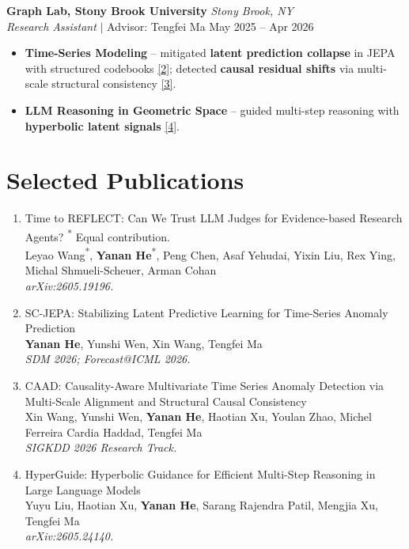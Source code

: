 \documentclass[a4paper,10pt]{article}
\begin{document}
\vspace{4pt}
\textbf{Graph Lab, Stony Brook University} \hfill \textit{Stony Brook, NY} \\
\textit{Research Assistant} $\mid$ Advisor: Tengfei Ma \hfill May 2025 -- Apr 2026
\begin{itemize}
  \item \textbf{Time-Series Modeling} -- mitigated \textbf{latent prediction collapse} in JEPA with structured codebooks \hyperlink{pub:scjepa}{[2]}; detected \textbf{causal residual shifts} via multi-scale structural consistency \hyperlink{pub:caad}{[3]}.
  \item \textbf{LLM Reasoning in Geometric Space} -- guided multi-step reasoning with \textbf{hyperbolic latent signals} \hyperlink{pub:hyperguide}{[4]}.
\end{itemize}

\section{Selected Publications}
\vspace{-10pt}
\begin{enumerate}[leftmargin=1.8em, itemsep=6pt, parsep=0pt]

\item \hypertarget{pub:reflect}{}Time to REFLECT: Can We Trust LLM Judges for Evidence-based Research Agents? \hfill {\scriptsize \textsuperscript{*} Equal contribution.} \\
Leyao Wang\textsuperscript{*}, \textbf{Yanan He}\textsuperscript{*}, Peng Chen, Asaf Yehudai, Yixin Liu, Rex Ying, Michal Shmueli-Scheuer, Arman Cohan \\
\textit{arXiv:2605.19196.}

\item \hypertarget{pub:scjepa}{}SC-JEPA: Stabilizing Latent Predictive Learning for Time-Series Anomaly Prediction \\
\textbf{Yanan He}, Yunshi Wen, Xin Wang, Tengfei Ma \\
\textit{SDM 2026; Forecast@ICML 2026.}

\item \hypertarget{pub:caad}{}CAAD: Causality-Aware Multivariate Time Series Anomaly Detection via Multi-Scale Alignment and Structural Causal Consistency \\
Xin Wang, Yunshi Wen, \textbf{Yanan He}, Haotian Xu, Youlan Zhao, Michel Ferreira Cardia Haddad, Tengfei Ma \\
\textit{SIGKDD 2026 Research Track.}

\item \hypertarget{pub:hyperguide}{}HyperGuide: Hyperbolic Guidance for Efficient Multi-Step Reasoning in Large Language Models \\
Yuyu Liu, Haotian Xu, \textbf{Yanan He}, Sarang Rajendra Patil, Mengjia Xu, Tengfei Ma \\
\textit{arXiv:2605.24140.}

\end{enumerate}
\end{document}
